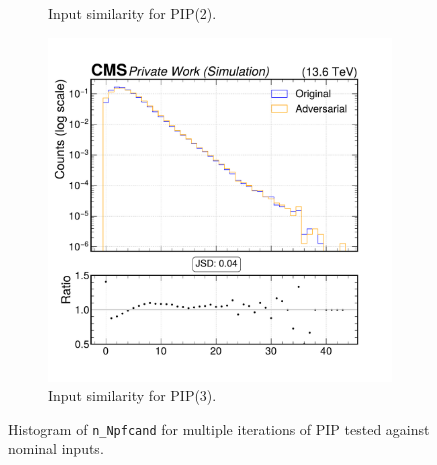 \begin{figure}[h]
\begin{subfigure}[t]{0.32\textwidth}
    \caption{Input similarity for PIP(2).}
  \end{subfigure}\hfill
  \begin{subfigure}[t]{0.32\textwidth}
    \includegraphics[width=\linewidth]{media/output/features/compare/intprob_3/cmp_global_features_n_Npfcand.pdf}
    \caption{Input similarity for PIP(3).}
  \end{subfigure}

  \caption{Histogram of \texttt{n\_Npfcand} for multiple iterations of PIP tested against nominal inputs.}
  \label{fig:intprob_input_n_Npfcand}
\end{figure}
